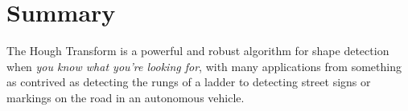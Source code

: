 \documentclass{article}
\begin{document}
\section{Summary}
The Hough Transform is a powerful and robust algorithm for shape detection when \textit{you know what you're looking for}, with many applications from something as contrived as detecting the rungs of a ladder to detecting street signs or markings on the road in an autonomous vehicle. 
\end{document}
